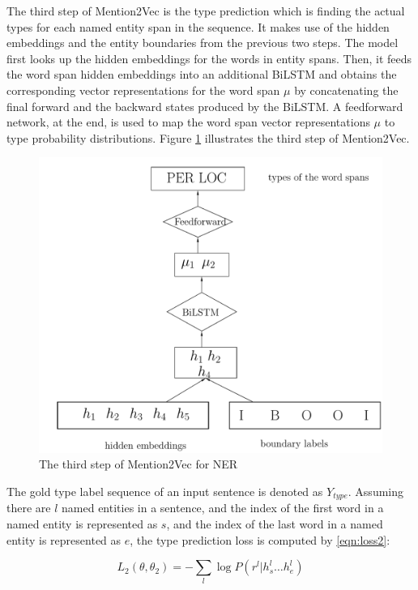 The third step of Mention2Vec is the type prediction which is finding the actual types for each named entity span in the sequence. It makes use of the hidden embeddings and the entity boundaries from the previous two steps. The model first looks up the hidden embeddings for the words in entity spans. Then, it feeds the word span hidden embeddings into an additional BiLSTM and obtains the corresponding vector representations for the word span $\mu$ by concatenating the final forward and the backward states produced by the BiLSTM. A feedforward network, at the end, is used to map the word span vector representations $\mu$ to type probability distributions. Figure \ref{fig:mention2vec3} illustrates the third step of Mention2Vec.

\begin{figure}
  \centering
  \includegraphics[scale=0.6]{mention2vec3.pdf}
 \caption{The third step of Mention2Vec for NER}
  \label{fig:mention2vec3}
\end{figure}

The gold type label sequence of an input sentence is denoted as $Y_{type}$. Assuming there are $l$ named entities in a sentence, and the index of the first word in a named entity is represented as $s$, and the index of the last word in a named entity is represented as $e$, the type prediction loss is computed by \ref{eqn:loss2}:

\begin{equation}\label{eqn:loss2}
  L_{2}\left( \theta ,\theta _{2}\right) =-\sum _{l}\log P\left( r^{l}|h_{s}^{l}{\ldots }h_{e}^{l}\right)
\end{equation}

